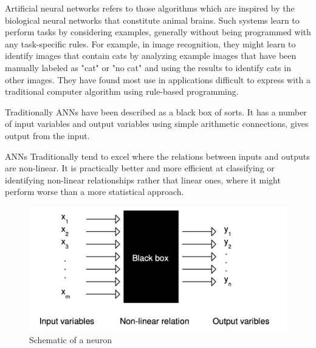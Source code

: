 \documentclass[BTech]{iitpdiss}
\begin{document}
Artificial neural networks refers to those algorithms which are inspired by the biological neural networks that constitute animal brains. Such systems learn to perform tasks by considering examples, generally without being programmed with any task-specific rules. For example, in image recognition, they might learn to identify images that contain cats by analyzing example images that have been manually labeled as "cat" or "no cat" and using the results to identify cats in other images. They have found most use in applications difficult to express with a traditional computer algorithm using rule-based programming.

Traditionally ANNs have been described as a black box of sorts. It has a number of input variables and output variables using simple arithmetic connections, gives output from the input.

ANNs Traditionally tend to excel where the relations between inputs and outputs are non-linear. It is practically better and more efficient at classifying or identifying non-linear relationships rather that linear ones, where it might perform worse than a more statistical approach.

\begin{figure}
	\centering
	\includegraphics[width=1\textwidth]{images/ann.png}
	\caption{Schematic of a neuron}
	\label{fig:neuron}
\end{figure}

\begin{singlespace}
	
	
\end{singlespace}




%
\end{document}
